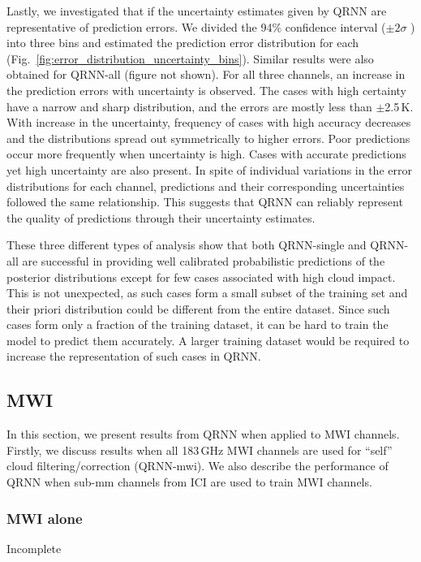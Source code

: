 \documentclass[amt, manuscript]{copernicus}
\newcommand{\todo}[1]{{\color{red} #1}}
\begin{document}
Lastly, we investigated that if the uncertainty estimates given by QRNN are representative of prediction errors.  We divided the 94\% confidence interval ($\pm2\sigma$ ) into three bins and estimated the prediction error distribution for each (Fig.~\ref{fig:error_distribution_uncertainty_bins}). Similar results were also obtained for QRNN-all (figure not shown). For all three channels, an increase in the prediction errors with uncertainty is observed. The cases with high certainty have a narrow and sharp distribution, and the errors are mostly less than $\pm$2.5\,K. With increase in the uncertainty, frequency of cases with high accuracy decreases and the distributions spread out symmetrically to higher errors. Poor predictions occur more frequently when uncertainty is high. Cases with accurate predictions yet high uncertainty are also present. In spite of individual variations in the error distributions for each channel, predictions and their corresponding uncertainties followed the same relationship. This suggests that QRNN can reliably represent the quality of predictions through their uncertainty estimates.

These three different types of analysis show that both QRNN-single and QRNN-all are successful in providing well calibrated probabilistic predictions of the posterior distributions except for few cases associated with high cloud impact. This is not unexpected, as such cases form a small subset of the training set and their priori distribution could be different from the entire dataset. Since such cases form only a fraction of the training dataset, it can be hard to train the model to predict them accurately. A larger training dataset would be required to increase the representation of such cases in QRNN.


\subsection{MWI}
%
In this section, we present results from QRNN when applied to MWI channels. Firstly, we discuss results when all 183\,GHz MWI channels are used for ``self'' cloud filtering/correction (QRNN-mwi). We also describe the performance of QRNN when sub-mm channels from ICI are used to train MWI channels.
\subsubsection{MWI alone}
\todo {Incomplete}
\end{document}
